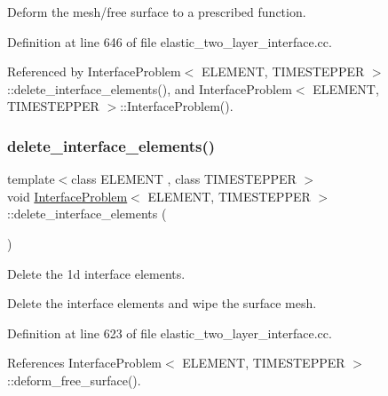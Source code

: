 Deform the mesh/free surface to a prescribed function. 



Definition at line 646 of file elastic\+\_\+two\+\_\+layer\+\_\+interface.\+cc.



Referenced by Interface\+Problem$<$ E\+L\+E\+M\+E\+N\+T, T\+I\+M\+E\+S\+T\+E\+P\+P\+E\+R $>$\+::delete\+\_\+interface\+\_\+elements(), and Interface\+Problem$<$ E\+L\+E\+M\+E\+N\+T, T\+I\+M\+E\+S\+T\+E\+P\+P\+E\+R $>$\+::\+Interface\+Problem().

\mbox{\label{classInterfaceProblem_ac2aaab086d9bbd3913ce8bc0d244413d}} 
\subsubsection{\texorpdfstring{delete\+\_\+interface\+\_\+elements()}{delete\_interface\_elements()}}
{\footnotesize\ttfamily template$<$class E\+L\+E\+M\+E\+NT , class T\+I\+M\+E\+S\+T\+E\+P\+P\+ER $>$ \\
void \hyperlink{classInterfaceProblem}{Interface\+Problem}$<$ E\+L\+E\+M\+E\+NT, T\+I\+M\+E\+S\+T\+E\+P\+P\+ER $>$\+::delete\+\_\+interface\+\_\+elements (\begin{DoxyParamCaption}{ }\end{DoxyParamCaption})\hspace{0.3cm}{\ttfamily [private]}}



Delete the 1d interface elements. 

Delete the interface elements and wipe the surface mesh. 

Definition at line 623 of file elastic\+\_\+two\+\_\+layer\+\_\+interface.\+cc.



References Interface\+Problem$<$ E\+L\+E\+M\+E\+N\+T, T\+I\+M\+E\+S\+T\+E\+P\+P\+E\+R $>$\+::deform\+\_\+free\+\_\+surface().

\mbox{\label{classInterfaceProblem_a49714e35e94f7d2af0b6ddd22b851f52}} 
